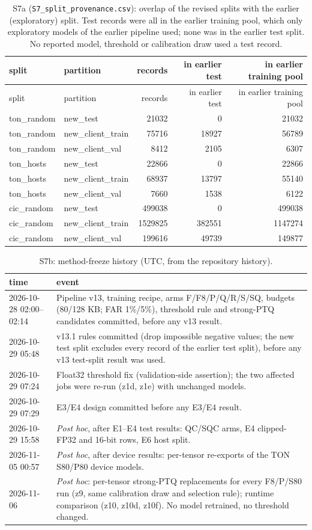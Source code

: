 \documentclass[10pt]{article}
\begin{document}
{\scriptsize
\begin{longtable}{llrrr}
\caption{S7a (\texttt{S7\_split\_provenance.csv}): overlap of the revised splits with the earlier (exploratory) split. Test records were all in the earlier training pool, which only exploratory models of the earlier pipeline used; none was in the earlier test split. No reported model, threshold or calibration draw used a test record.}\\
\toprule
split & partition & records & in earlier test & in earlier training pool \\
\midrule
\endfirsthead
\toprule
split & partition & records & in earlier test & in earlier training pool \\
\midrule
\endhead
\bottomrule
\endlastfoot
ton\_random & new\_test & 21032 & 0 & 21032 \\
ton\_random & new\_client\_train & 75716 & 18927 & 56789 \\
ton\_random & new\_client\_val & 8412 & 2105 & 6307 \\
ton\_hosts & new\_test & 22866 & 0 & 22866 \\
ton\_hosts & new\_client\_train & 68937 & 13797 & 55140 \\
ton\_hosts & new\_client\_val & 7660 & 1538 & 6122 \\
cic\_random & new\_test & 499038 & 0 & 499038 \\
cic\_random & new\_client\_train & 1529825 & 382551 & 1147274 \\
cic\_random & new\_client\_val & 199616 & 49739 & 149877 \\
\end{longtable}}

{\scriptsize\begin{longtable}{lp{20cm}}\caption{S7b: method-freeze history (UTC, from the repository history).}\\ \toprule time & event \\ \midrule
2026-10-28 02:00--02:14 & Pipeline v13, training recipe, arms F/F8/P/Q/R/S/SQ, budgets (80/128 KB; FAR 1\%/5\%), threshold rule and strong-PTQ candidates committed, before any v13 result. \\
2026-10-29 05:48 & v13.1 rules committed (drop impossible negative values; the new test split excludes every record of the earlier test split), before any v13 test-split result was used. \\
2026-10-29 07:24 & Float32 threshold fix (validation-side assertion); the two affected jobs were re-run (z1d, z1e) with unchanged models. \\
2026-10-29 07:29 & E3/E4 design committed before any E3/E4 result. \\
2026-10-29 15:58 & \emph{Post hoc}, after E1--E4 test results: QC/SQC arms, E4 clipped-FP32 and 16-bit rows, E6 host split. \\
2026-11-05 00:57 & \emph{Post hoc}, after device results: per-tensor re-exports of the TON S80/P80 device models. \\
2026-11-06 & \emph{Post hoc}: per-tensor strong-PTQ replacements for every F8/P/S80 run (z9, same calibration draw and selection rule); runtime comparison (z10, z10d, z10f). No model retrained, no threshold changed. \\
\bottomrule\end{longtable}}
\end{document}
